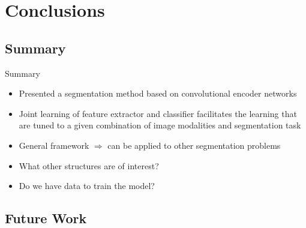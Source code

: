 \documentclass{beamer}
\begin{document}
\section{Conclusions}

\subsection{Summary}

\begin{frame}{Summary}
\begin{itemize}
\item Presented a segmentation method based on convolutional encoder networks
\item Joint learning of feature extractor and classifier facilitates the
learning that are tuned to a given combination of image modalities and
segmentation task
\item General framework $\Rightarrow$ can be applied to other segmentation
problems
\end{itemize}

\begin{itemize}
\item[\faQuestionCircle] What other structures are of interest?
\item[\faQuestionCircle] Do we have data to train the model? 
\end{itemize}
\end{frame}

\subsection{Future Work}
\end{document}
